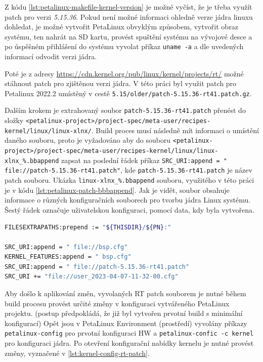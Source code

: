 \documentclass[a4paper, twoside, 11pt]{article}
\begin{document}
				Z kódu \ref{lst:petalinux-makefile-kernel-version} je možné vyčíst, že je třeba využít patch pro verzi \textit{5.15.36}. Pokud není možné informaci ohledně verze jádra linuxu dohledat, je možné vytvořit PetaLinux obvyklým způsobem, vytvořit obraz systému, ten nahrát na SD kartu, provést spuštění systému na vývojové desce a po úspěšném přihlášení do systému vyvolat příkaz \texttt{uname -a} a dle uvedených informací odvodit verzi jádra.\par
				Poté je z adresy \href{https://cdn.kernel.org/pub/linux/kernel/projects/rt/}{\textcolor{ctublue}{https://cdn.kernel.org/pub/linux/kernel/projects/rt/}} možné stáhnout patch pro zjištěnou verzi jádra. V této práci byl využit patch pro Petalinux 2022.2 umístěný v cestě \texttt{5.15/older/patch-5.15.36-rt41.patch.gz}.\par
				Dalším krokem je extrahovaný soubor \texttt{patch-5.15.36-rt41.patch} přenést do složky \texttt{<petalinux-project>/project-spec/meta-user/recipes-kernel/linux/linux-xlnx/}. Build proces musí následně mít informaci o umístění daného souboru, proto je vyžadováno aby do souboru \texttt{<petalinux-project>/project-spec/meta-user/recipes-kernel/linux/linux-xlnx\_\%.bbappend} zapsat na poslední řádek příkaz \texttt{SRC\_URI:append = " file://patch-5.15.36-rt41.patch"}, kde \texttt{patch-5.15.36-rt41.patch} je název patch souboru. Ukázka \texttt{linux-xlnx\_\%.bbappend} souboru, využitého v této práci je v kódu \ref{lst:petalinux-patch-bbbappend}. Jak je vidět, soubor obsahuje informace o různých konfiguračních souborech pro tvorbu jádra Linux systému. Šestý řádek označuje uživatelskou konfiguraci, pomocí data, kdy byla vytvořena.

				\begin{lstlisting}[language={sh}, caption={Ukázka konfiguračního souboru pro aplikování Linux patch souboru.}, label= {lst:petalinux-patch-bbbappend}]
FILESEXTRAPATHS:prepend := "${THISDIR}/${PN}:"

SRC_URI:append = " file://bsp.cfg"
KERNEL_FEATURES:append = " bsp.cfg"
SRC_URI:append = " file://patch-5.15.36-rt41.patch"
SRC_URI += "file://user_2023-04-07-11-32-00.cfg"\end{lstlisting}

				Aby došlo k aplikování změn, vyvolaných RT patch souborem je nutné během build procesu provést určité změny v konfiguraci vytvářeného PetaLinux projektu. (postup předpokládá, že již byl vytvořen prvotní build s minimální konfigurací) Opět jsou v PetaLinux Environment (prostředí) vyvolány příkazy \texttt{petalinux-config} pro prvotní konfiguraci HW a \texttt{petalinux-confic -c kernel} pro konfiguraci jádra. Po otevření konfigurační nabídky kernelu je nutné provést změny, vyznačené v \ref{lst:kernel-config-rt-patch}.
\end{document}
